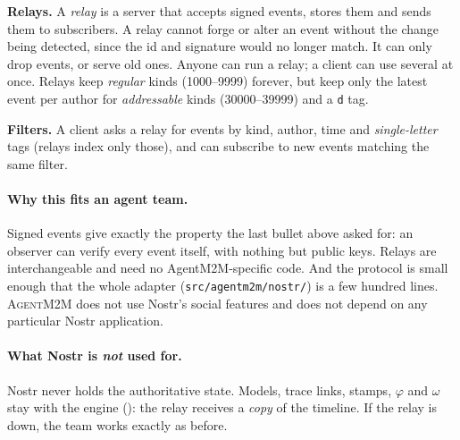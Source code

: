 \documentclass[10pt,a4paper]{article}
\newcommand{\tool}{\textsc{AgentM2M}}
\newcommand{\code}[1]{\texttt{#1}}
\newcommand{\file}[1]{\texttt{#1}}
\theoremstyle{definition}
\newcommand{\what}[1]{\par\smallskip\noindent\textbf{#1}\quad}
\begin{document}
\what{Relays.} A \emph{relay} is a server that accepts signed events,
stores them and sends them to subscribers. A relay cannot forge or alter an
event without the change being detected, since the id and signature would no
longer match. It can only drop events, or serve old ones. Anyone can run
a relay; a client can use several at once. Relays keep \emph{regular} kinds
(1000--9999) forever, but keep only the latest event per author for
\emph{addressable} kinds (30000--39999) and a \code{d} tag.

\what{Filters.} A client asks a relay for events by kind, author, time and
\emph{single-letter} tags (relays index only those), and can subscribe to new
events matching the same filter.

\paragraph{Why this fits an agent team.} Signed events give exactly the
property the last bullet above asked for: an observer can verify every event
itself, with nothing but public keys. Relays are interchangeable and need no
AgentM2M-specific code. And the protocol is small enough that the whole
adapter (\file{src/agentm2m/nostr/}) is a few hundred lines. \tool{} does not
use Nostr's social features and does not depend on any particular Nostr
application.

\paragraph{What Nostr is \emph{not} used for.} Nostr never holds the
authoritative state. Models, trace links, stamps, $\varphi$ and $\omega$ stay
with the engine (): the relay receives a \emph{copy} of the
timeline. If the relay is down, the team works exactly as before.
\end{document}
